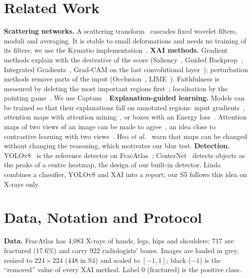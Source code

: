 \documentclass[conference]{IEEEtran}
\begin{document}
\section{Related Work}
\textbf{Scattering networks.} A scattering transform~\cite{bruna2013scattering} cascades fixed wavelet filters,
moduli and averaging. It is stable to small deformations and needs no training of its filters; we use the Kymatio
implementation~\cite{andreux2020kymatio}.
\textbf{XAI methods.} Gradient methods explain with the derivative of the score (Saliency~\cite{simonyan2014saliency},
Guided Backprop~\cite{springenberg2015guided}, Integrated Gradients~\cite{sundararajan2017ig}, Grad-CAM on the last
convolutional layer~\cite{selvaraju2017gradcam}); perturbation methods remove parts of the input
(Occlusion~\cite{zeiler2014occlusion}, LIME~\cite{ribeiro2016lime}). Faithfulness is measured by deleting the most
important regions first~\cite{samek2017deletion}; localisation by the pointing game~\cite{zhang2018pointing}. We use
Captum~\cite{kokhlikyan2020captum}.
\textbf{Explanation-guided learning.} Models can be trained so that their explanations fall on annotated regions:
input gradients~\cite{ross2017rrr}, attention maps with attention mining~\cite{li2018gain}, or boxes with an Energy
loss~\cite{rao2023guide}. Attention maps of two views of an image can be made to agree~\cite{guo2019consistency},
an idea close to contrastive learning with two views~\cite{chen2020simclr}. Heo \emph{et al.}~\cite{heo2019fooling}
warn that maps can be changed without changing the reasoning, which motivates our blur test.
\textbf{Detection.} YOLOv8~\cite{jocher2023yolov8} is the reference detector on FracAtlas~\cite{abedeen2023fracatlas};
CenterNet~\cite{zhou2019centernet} detects objects as the peaks of a centre heatmap, the design of our built-in
detector. Linda~\cite{linda2025} combines a classifier, YOLOv8 and XAI into a report; our S5 follows this idea on
X-rays only.

\section{Data, Notation and Protocol}
\label{sec:setup}
\textbf{Data.} FracAtlas has 4,083 X-rays of hands, legs, hips and shoulders; 717 are fractured (17.6\%) and carry
922 radiologists' boxes. Images are loaded in grey, resized to $224\times224$ (448 in S4) and scaled to $[-1,1]$; black
($-1$) is the ``removed'' value of every XAI method. Label 0 (fractured) is the positive class.
\end{document}
